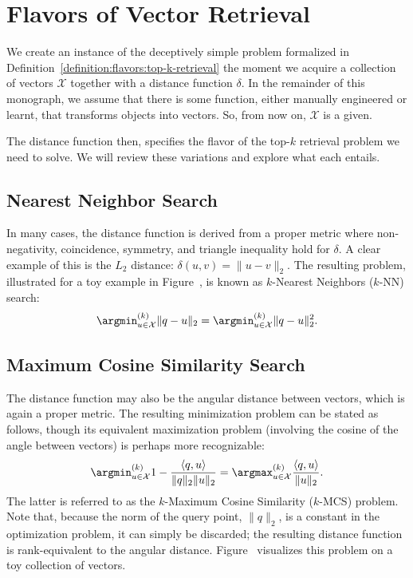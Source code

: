 \section{Flavors of Vector Retrieval}

We create an instance of the deceptively simple
problem formalized in Definition~\ref{definition:flavors:top-k-retrieval}
the moment we acquire a collection of vectors $\mathcal{X}$ together with
a distance function $\delta$.
In the remainder of this monograph, we assume that there is some function,
either manually engineered or learnt, that transforms objects into vectors.
So, from now on, $\mathcal{X}$ is a given.

The distance function then, specifies the flavor of the top-$k$ retrieval problem we need to solve.
We will review these variations and explore what each entails.

\subsection{Nearest Neighbor Search}
In many cases, the distance function is derived from a proper metric
where non-negativity, coincidence, symmetry, and triangle inequality hold for $\delta$.
A clear example of this is the $L_2$ distance:
$\delta(u, v) = \lVert u - v \rVert_2$. The resulting problem,
illustrated for a toy example in Figure~,
is known as $k$-Nearest Neighbors ($k$-NN) search:
\begin{equation}
    \label{equation:flavors:knn}
    \argmin^{(k)}_{u \in \mathcal{X}} \lVert q - u \rVert_2
    = \argmin^{(k)}_{u \in \mathcal{X}} \lVert q - u \rVert_2^2.
\end{equation}

\subsection{Maximum Cosine Similarity Search}

The distance function may also be the angular distance between vectors, which is again a proper metric.
The resulting minimization problem can be stated as follows,
though its equivalent maximization problem (involving the cosine of the angle between
vectors) is perhaps more recognizable:
\begin{equation}
    \label{equation:flavors:kmcs}
    \argmin^{(k)}_{u \in \mathcal{X}} 1 - \frac{\langle q, u \rangle}{\lVert q \rVert_2 \lVert u \rVert_2}
    = \argmax^{(k)}_{u \in \mathcal{X}} \frac{\langle q, u \rangle}{\lVert u \rVert_2}.
\end{equation}
The latter is referred to as the $k$-Maximum Cosine Similarity ($k$-MCS) problem.
Note that, because the norm of the query point, $\lVert q \rVert_2$, is a constant in the
optimization problem, it can simply be discarded; the resulting distance function is
rank-equivalent to the angular distance. Figure~
visualizes this problem on a toy collection of vectors.


